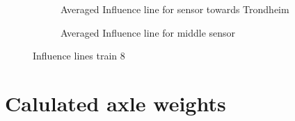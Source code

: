\begin{figure}[h]
  \centering
  \begin{subfigure}[t]{0.9\textwidth}
    \centering
    
    \label{heimdal_averaged}
  \end{subfigure}
  \begin{subfigure}[t]{0.9\textwidth}
    \centering
    
    \caption{Averaged Influence line for sensor towards Trondheim}
    \label{trondheim_averaged}
  \end{subfigure}
  \begin{subfigure}[t]{0.9\textwidth}
    \centering
    
    \caption{Averaged Influence line for middle sensor}
    \label{middle_averaged}
  \end{subfigure}
  \caption{Influence lines train 8}
  \label{influence_lines_train8}
\end{figure}

\newpage
\section{Calulated axle weights}

